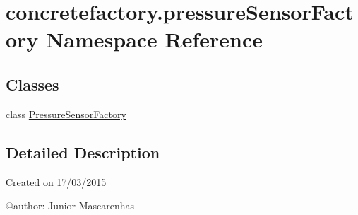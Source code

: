 \hypertarget{namespaceconcretefactory_1_1pressureSensorFactory}{}\section{concretefactory.\+pressure\+Sensor\+Factory Namespace Reference}
\label{namespaceconcretefactory_1_1pressureSensorFactory}
\subsection*{Classes}
\begin{DoxyCompactItemize}
\item 
class \hyperlink{classconcretefactory_1_1pressureSensorFactory_1_1PressureSensorFactory}{Pressure\+Sensor\+Factory}
\end{DoxyCompactItemize}


\subsection{Detailed Description}
\begin{DoxyVerb}Created on 17/03/2015

@author: Junior Mascarenhas
\end{DoxyVerb}
 